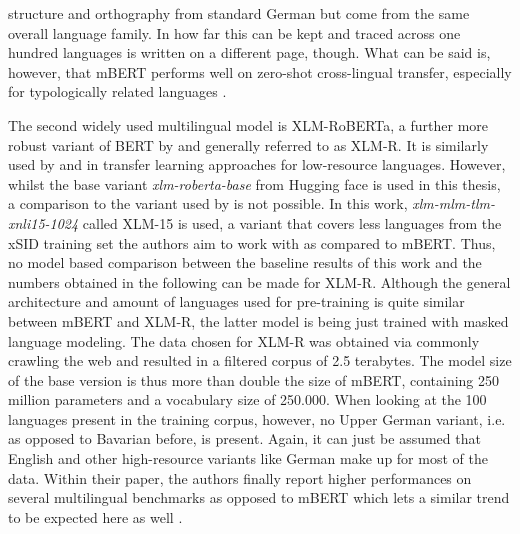 \documentclass[11pt,a4paper,twoside,openright]{scrbook}
\begin{document}
structure and orthography from standard German but come from the same overall language family. In how far this can be kept and traced across one hundred languages is written on a different page, though. What can be said is, however, that mBERT performs well on zero-shot cross-lingual transfer, especially for typologically related languages \citep{pires-etal-2019-multilingual}.

The second widely used multilingual model is XLM-RoBERTa, a further more robust variant of BERT by \citep{conneau-etal-2020-unsupervised} and generally referred to as XLM-R. It is similarly used by \citet{hedderich-etal-2020-transfer} and \citet{kwon-etal-2023-sidlr} in transfer learning approaches for low-resource languages. However, whilst the base variant \textit{xlm-roberta-base} from Hugging face is used in this thesis, a comparison to the variant used by \citet{van-der-goot-etal-2021-masked} is not possible. In this work, \textit{xlm-mlm-tlm-xnli15-1024} called XLM-15 is used, a variant that covers less languages from the xSID training set the authors aim to work with as compared to mBERT. Thus, no model based comparison between the baseline results of this work and the numbers obtained in the following can be made for XLM-R. Although the general architecture and amount of languages used for pre-training is quite similar between mBERT and XLM-R, the latter model is being just trained with masked language modeling. The data chosen for XLM-R was obtained via commonly crawling the web and resulted in a filtered corpus of 2.5 terabytes. The model size of the base version is thus more than double the size of mBERT, containing 250 million parameters and a vocabulary size of 250.000. When looking at the 100 languages present in the training corpus, however, no Upper German variant, i.e. as opposed to Bavarian before, is present. Again, it can just be assumed that English and other high-resource variants like German make up for most of the data. Within their paper, the authors finally report higher performances on several multilingual benchmarks as opposed to mBERT which lets a similar trend to be expected here as well \citep{conneau-etal-2020-unsupervised}.
\end{document}
